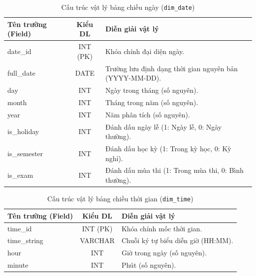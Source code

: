 \documentclass[12pt,a4paper]{article}
\begin{document}
\begin{table}[H]
\centering
\caption{Cấu trúc vật lý bảng chiều ngày (\texttt{dim\_date})}
\label{tab:dim_date}
\renewcommand{\arraystretch}{1.4}
\begin{tabularx}{\textwidth}{p{4.5cm} c X}
\toprule
\textbf{Tên trường (Field)} & \textbf{Kiểu DL} & \textbf{Diễn giải vật lý} \\
\midrule
date\_id       & INT (PK) & Khóa chính đại diện ngày. \\
full\_date     & DATE     & Trường lưu định dạng thời gian nguyên bản (YYYY-MM-DD). \\
day            & INT      & Ngày trong tháng (số nguyên). \\
month          & INT      & Tháng trong năm (số nguyên). \\
year           & INT      & Năm phân tích (số nguyên). \\
is\_holiday    & INT      & Đánh dấu ngày lễ (1: Ngày lễ, 0: Ngày thường). \\
is\_semester   & INT      & Đánh dấu học kỳ (1: Trong kỳ học, 0: Kỳ nghỉ). \\
is\_exam       & INT      & Đánh dấu mùa thi (1: Trong mùa thi, 0: Bình thường). \\
\bottomrule
\end{tabularx}
\end{table}

\begin{table}[H]
\centering
\caption{Cấu trúc vật lý bảng chiều thời gian (\texttt{dim\_time})}
\label{tab:dim_time}
\renewcommand{\arraystretch}{1.4}
\begin{tabularx}{\textwidth}{p{4.5cm} c X}
\toprule
\textbf{Tên trường (Field)} & \textbf{Kiểu DL} & \textbf{Diễn giải vật lý} \\
\midrule
time\_id     & INT (PK) & Khóa chính mốc thời gian. \\
time\_string & VARCHAR  & Chuỗi ký tự biểu diễn giờ (HH:MM). \\
hour         & INT      & Giờ trong ngày (số nguyên). \\
minute       & INT      & Phút (số nguyên). \\
\bottomrule
\end{tabularx}
\end{table}
\end{document}
